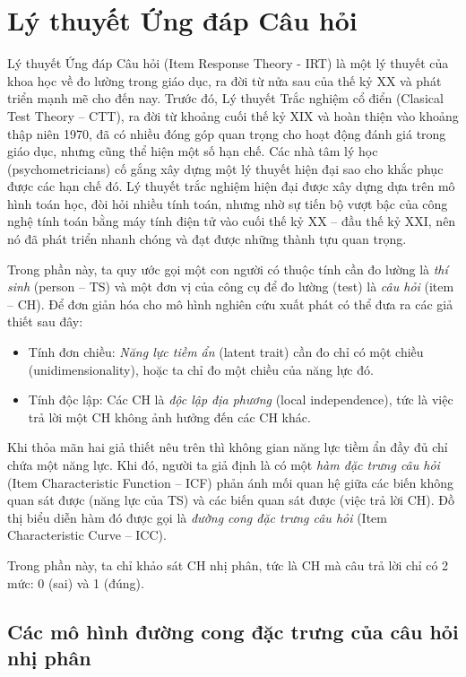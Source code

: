 \section{Lý thuyết Ứng đáp Câu hỏi}
Lý thuyết Ứng đáp Câu hỏi (Item Response Theory - IRT) là một lý thuyết của khoa học về đo lường trong giáo dục, ra đời từ nửa sau của thế kỷ XX và phát triển mạnh mẽ cho đến nay. Trước đó, Lý thuyết Trắc nghiệm cổ điển (Clasical Test Theory – CTT), ra đời từ khoảng cuối thế kỷ XIX và hoàn thiện vào khoảng thập niên 1970, đã có nhiều đóng góp quan trọng cho hoạt động đánh giá trong giáo dục, nhưng cũng thể hiện một số hạn chế. Các nhà tâm lý học (psychometricians) cố gắng xây dựng một lý thuyết hiện đại sao cho khắc phục được các hạn chế đó. Lý thuyết trắc nghiệm hiện đại được xây dựng dựa trên mô hình toán học, đòi hỏi nhiều tính toán, nhưng nhờ sự tiến bộ vượt bậc của công nghệ tính toán bằng máy tính điện tử vào cuối thế kỷ XX – đầu thế kỷ XXI, nên nó đã phát triển nhanh chóng và đạt được những thành tựu quan trọng.\par
Trong phần này, ta quy ước gọi một con người có thuộc tính cần đo lường là \textit{thí sinh} (person – TS) và một đơn vị của công cụ để đo lường (test) là \textit{câu hỏi} (item – CH). Để đơn giản hóa cho mô hình nghiên cứu xuất phát có thể đưa ra các giả thiết sau đây:\par
\begin{itemize}
	\item Tính đơn chiều: \textit{Năng lực tiềm ẩn} (latent trait) cần đo chỉ có một chiều (unidimensionality), hoặc ta chỉ đo một chiều của năng lực đó.
	\item Tính độc lập: Các CH là \textit{độc lập địa phương} (local independence), tức là việc trả lời một CH không ảnh hưởng đến các CH khác.
\end{itemize}\par
Khi thỏa mãn hai giả thiết nêu trên thì không gian năng lực tiềm ẩn đầy đủ chỉ chứa một năng lực. Khi đó, người ta giả định là có một \textit{hàm đặc trưng câu hỏi} (Item Characteristic Function – ICF) phản ánh mối quan hệ giữa các biến không quan sát được (năng lực của TS) và các biến quan sát được (việc trả lời CH). Đồ thị biểu diễn hàm đó được gọi là \textit{đường cong đặc trưng câu hỏi} (Item Characteristic Curve – ICC).\par
Trong phần này, ta chỉ khảo sát CH nhị phân, tức là CH mà câu trả lời chỉ có 2 mức: 0 (sai) và 1 (đúng).

\subsection{Các mô hình đường cong đặc trưng của câu hỏi nhị phân}
